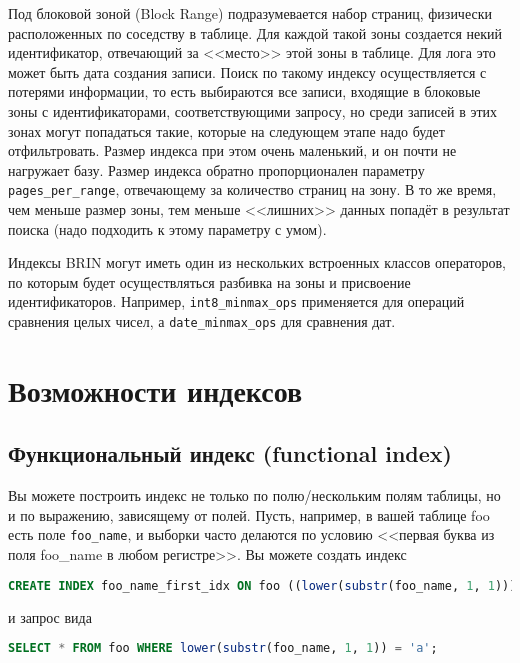 Под блоковой зоной (Block Range) подразумевается набор страниц, физически расположенных по соседству в таблице. Для каждой такой зоны создается некий идентификатор, отвечающий за <<место>> этой зоны в таблице. Для лога это может быть дата создания записи. Поиск по такому индексу осуществляется с потерями информации, то есть выбираются все записи, входящие в блоковые зоны с идентификаторами, соответствующими запросу, но среди записей в этих зонах могут попадаться такие, которые на следующем этапе надо будет отфильтровать. Размер индекса при этом очень маленький, и он почти не нагружает базу. Размер индекса обратно пропорционален параметру \lstinline!pages_per_range!, отвечающему за количество страниц на зону. В то же время, чем меньше размер зоны, тем меньше <<лишних>> данных попадёт в результат поиска (надо подходить к этому параметру с умом).

Индексы BRIN могут иметь один из нескольких встроенных классов операторов, по которым будет осуществляться разбивка на зоны и присвоение идентификаторов. Например, \lstinline!int8_minmax_ops! применяется для операций сравнения целых чисел, а \lstinline!date_minmax_ops! для сравнения дат.



\section{Возможности индексов}


\subsection{Функциональный индекс (functional index)}

Вы можете построить индекс не только по полю/нескольким полям таблицы, но и по выражению, зависящему от полей. Пусть, например, в вашей таблице foo есть поле \lstinline!foo_name!, и выборки часто делаются по условию <<первая буква из поля foo\_name в любом регистре>>. Вы можете создать индекс

\begin{lstlisting}[language=SQL,label=lst:summary-indexes1,caption=Индекс]
CREATE INDEX foo_name_first_idx ON foo ((lower(substr(foo_name, 1, 1))));
\end{lstlisting}

и запрос вида

\begin{lstlisting}[language=SQL,label=lst:summary-indexes2,caption=Запрос]
SELECT * FROM foo WHERE lower(substr(foo_name, 1, 1)) = 'а';
\end{lstlisting}

